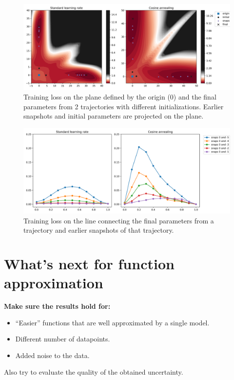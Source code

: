 \begin{figure}[H]
	\centering
	\includegraphics[width=1\linewidth]{./figs/origin_planes.png}  
	\caption{Training loss on the plane defined by the origin (0) and the final parameters from 2 trajectories with different initializations. Earlier snapshots and initial parameters are projected on the plane.}
	\label{}
\end{figure}

\begin{figure}[H]
	\centering
	\includegraphics[width=1\linewidth]{./figs/line_plots.png}  
	\caption{Training loss on the line connecting the final parameters from a trajectory and earlier snapshots of that trajectory.}
	\label{}
\end{figure}

\section{What's next for function approximation}
\noindent
\textbf{Make sure the results hold for:}
\begin{itemize}
	\item ``Easier'' functions that are well approximated by a single model.
	\item Different number of datapoints.
	\item Added noise to the data.
\end{itemize}
Also try to evaluate the quality of the obtained uncertainty.

